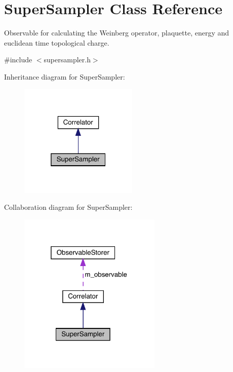 \hypertarget{class_super_sampler}{}\section{Super\+Sampler Class Reference}
\label{class_super_sampler}


Observable for calculating the Weinberg operator, plaquette, energy and euclidean time topological charge.  




{\ttfamily \#include $<$supersampler.\+h$>$}



Inheritance diagram for Super\+Sampler\+:\nopagebreak
\begin{figure}[H]
\begin{center}
\leavevmode
\includegraphics[width=160pt]{class_super_sampler__inherit__graph}
\end{center}
\end{figure}


Collaboration diagram for Super\+Sampler\+:\nopagebreak
\begin{figure}[H]
\begin{center}
\leavevmode
\includegraphics[width=193pt]{class_super_sampler__coll__graph}
\end{center}
\end{figure}
